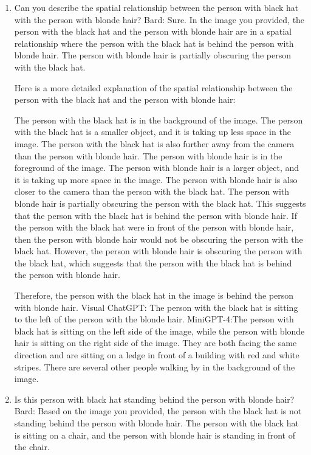 \begin{enumerate}
    \item Can you describe the spatial relationship between the person with black hat with the person with blonde hair?
    \subitem Bard: 
    Sure. In the image you provided, the person with the black hat and the person with blonde hair are in a spatial relationship where the person with the black hat is behind the person with blonde hair. The person with blonde hair is partially obscuring the person with the black hat.
    
    Here is a more detailed explanation of the spatial relationship between the person with the black hat and the person with blonde hair:
    
    The person with the black hat is in the background of the image. The person with the black hat is a smaller object, and it is taking up less space in the image. The person with the black hat is also further away from the camera than the person with blonde hair.
    The person with blonde hair is in the foreground of the image. The person with blonde hair is a larger object, and it is taking up more space in the image. The person with blonde hair is also closer to the camera than the person with the black hat.
    The person with blonde hair is partially obscuring the person with the black hat. This suggests that the person with the black hat is behind the person with blonde hair.
    If the person with the black hat were in front of the person with blonde hair, then the person with blonde hair would not be obscuring the person with the black hat. However, the person with blonde hair is obscuring the person with the black hat, which suggests that the person with the black hat is behind the person with blonde hair.
    
    Therefore, the person with the black hat in the image is behind the person with blonde hair.     
    \subitem Visual ChatGPT: The person with the black hat is sitting to the left of the person with the blonde hair.
    \subitem MiniGPT-4:The person with black hat is sitting on the left side of the image, while the person with blonde hair is sitting on the right side of the image. They are both facing the same direction and are sitting on a ledge in front of a building with red and white stripes. There are several other people walking by in the background of the image. 
    \item Is this person with black hat standing behind the person with blonde hair?
    \subitem Bard: 
    Based on the image you provided, the person with the black hat is not standing behind the person with blonde hair. The person with the black hat is sitting on a chair, and the person with blonde hair is standing in front of the chair.
    

\end{enumerate}
